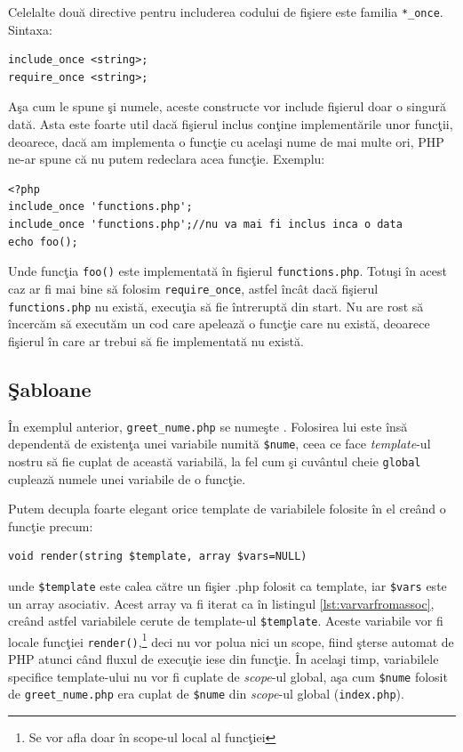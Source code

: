 
Celelalte două directive pentru includerea codului de fişiere este familia
\texttt{*\_once}. Sintaxa:
\begin{verbatim}
include_once <string>;
require_once <string>;
\end{verbatim}
Aşa cum le spune şi numele, aceste constructe vor include fişierul doar o singură
dată. Asta este foarte util dacă fişierul inclus conţine implementările unor funcţii,
deoarece, dacă am implementa o funcţie cu acelaşi nume de mai multe ori, PHP
ne-ar spune că nu putem redeclara acea funcţie. Exemplu:
\begin{lstlisting}
<?php
include_once 'functions.php';
include_once 'functions.php';//nu va mai fi inclus inca o data
echo foo();
\end{lstlisting}
Unde funcţia \texttt{foo()} este implementată în fişierul \texttt{functions.php}.
Totuşi în acest caz ar fi mai bine să folosim \texttt{require\_once}, astfel încât dacă
fişierul \texttt{functions.php} nu există, execuţia să fie întreruptă din start.
Nu are rost să încercăm să executăm un cod care apelează o funcţie care nu există,
deoarece fişierul în care ar trebui să fie implementată nu există.

\subsection{Şabloane}
În exemplul anterior, \texttt{greet\_nume.php} se numeşte .
Folosirea lui este însă dependentă de existenţa unei variabile numită \texttt{\$nume},
ceea ce face \textit{template}-ul nostru să fie cuplat de această variabilă, la fel
cum şi cuvântul cheie \texttt{global} cuplează numele unei variabile de o funcţie.

Putem decupla foarte elegant orice template de variabilele folosite
în el creând o funcţie precum:
\begin{verbatim}
void render(string $template, array $vars=NULL)
\end{verbatim}
unde \texttt{\$template} este calea către un fişier .php folosit
ca template, iar \texttt{\$vars} este un array asociativ. Acest array
va fi iterat ca în listingul \ref{lst:varvarfromassoc}, creând astfel
variabilele cerute de template-ul \texttt{\$template}. Aceste variabile
vor fi locale funcţiei \texttt{render()},\footnote{Se vor afla doar în scope-ul local
al funcţiei} deci nu vor polua nici un scope, fiind şterse automat de PHP
atunci când fluxul de execuţie iese din funcţie. În acelaşi timp, variabilele
specifice template-ului nu vor fi cuplate de \textit{scope}-ul global, aşa cum \texttt{\$nume}
folosit de \texttt{greet\_nume.php} era cuplat de \texttt{\$nume} din \textit{scope}-ul
global (\texttt{index.php}).

